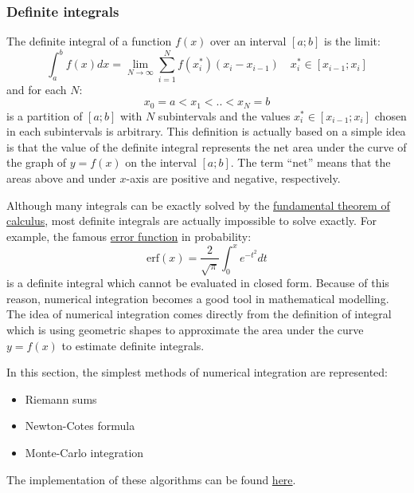 \subsubsection{Definite integrals}
The definite integral of a function $f(x)$ over an interval $[a;b]$ is the limit:
\begin{equation}
	\int_a^b f(x) dx = \lim_{N \rightarrow \infty} \sum_{i=1}^N f(x^*_i) (x_i - x_{i-1}) \quad x^*_i \in [x_{i-1}; x_i]
\end{equation}
and for each $N$:
\begin{equation}
	x_0 = a < x_1 < .. < x_N = b
\end{equation}
is a partition of $[a;b]$ with $N$ subintervals and the values $x^*_i \in [x_{i-1}; x_i]$ chosen in each subintervals is arbitrary. This definition is actually based on a simple idea is that the value of the definite integral represents the net area under the curve of the graph of $y = f(x)$ on the interval $[a;b]$. The term ``net'' means that the areas above and under $x$-axis are positive and negative, respectively. 

Although many integrals can be exactly solved by the \href{https://en.wikipedia.org/wiki/Fundamental_theorem_of_calculus}{fundamental theorem of calculus}, most definite integrals are actually impossible to solve exactly. For example, the famous \href{https://en.wikipedia.org/wiki/Error_function}{error function} in probability:
\begin{equation}
	\text{erf}(x) = \frac{2}{\sqrt{\pi}} \int_0^x e^{-t^2}dt
\end{equation}
is a definite integral which cannot be evaluated in closed form. Because of this reason, numerical integration becomes a good tool in mathematical modelling. The idea of numerical integration comes directly from the definition of integral which is using geometric shapes to approximate the area under the curve $y = f(x)$ to estimate definite integrals. 

In this section, the simplest methods of numerical integration are represented: 
\begin{itemize}
    \setlength\itemsep{0em}
    \item Riemann sums
    \item Newton-Cotes formula
    \item Monte-Carlo integration
\end{itemize}
The implementation of these algorithms can be found \href{https://github.com/chitn/quantfin_study/blob/master/code/integration.py}{here}.



